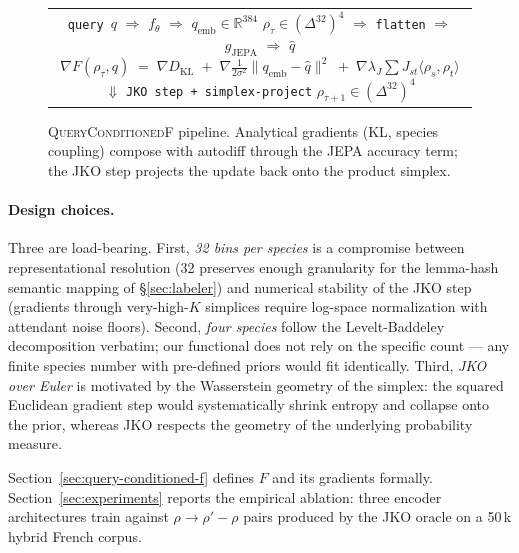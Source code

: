 \begin{figure}[t]
  \centering
  \small
  \begin{tabular}{c}
    \fbox{\parbox{0.9\linewidth}{\centering
      \texttt{query $q$} \quad $\Longrightarrow$ \quad
      $f_\theta$ \quad $\Longrightarrow$ \quad
      $q_{\mathrm{emb}} \in \mathbb{R}^{384}$ \\[1ex]
      $\rho_\tau \in (\Delta^{32})^4$ \quad $\Longrightarrow$ \quad
      \texttt{flatten} \quad $\Longrightarrow$ \quad
      $g_{\mathrm{JEPA}}$ \quad $\Longrightarrow$ \quad $\hat{q}$ \\[1ex]
      \bigskip
      $\nabla F(\rho_\tau, q) \;=\;
       \nabla D_{\mathrm{KL}} \;+\;
       \nabla \tfrac{1}{2\sigma^2}\|q_{\mathrm{emb}} - \hat{q}\|^2 \;+\;
       \nabla \lambda_J \sum J_{st}\langle\rho_s, \rho_t\rangle$ \\[1ex]
      $\Downarrow$ \quad \texttt{JKO step + simplex-project} \\[1ex]
      $\rho_{\tau+1} \in (\Delta^{32})^4$
    }}
  \end{tabular}
  \caption{\textsc{QueryConditionedF} pipeline. Analytical
    gradients (KL, species coupling) compose with autodiff
    through the JEPA accuracy term; the JKO step projects the
    update back onto the product simplex.}
  \label{fig:pipeline}
\end{figure}

\paragraph{Design choices.} Three are load-bearing. First,
\emph{32 bins per species} is a compromise between representational
resolution (32 preserves enough granularity for the lemma-hash
semantic mapping of \S\ref{sec:labeler}) and numerical stability
of the JKO step (gradients through very-high-$K$ simplices require
log-space normalization with attendant noise floors). Second,
\emph{four species} follow the Levelt-Baddeley decomposition
\citep{levelt1989speaking, baddeley1974} verbatim; our functional
does not rely on the specific count --- any finite species number
with pre-defined priors would fit identically. Third, \emph{JKO
over Euler} is motivated by the Wasserstein geometry of the
simplex: the squared Euclidean gradient step would systematically
shrink entropy and collapse onto the prior, whereas JKO respects
the geometry of the underlying probability measure.

Section~\ref{sec:query-conditioned-f} defines $F$ and its
gradients formally. Section~\ref{sec:experiments} reports the
empirical ablation: three encoder architectures train against
$\rho \to \rho' - \rho$ pairs produced by the JKO oracle on a
50\,k hybrid French corpus.
